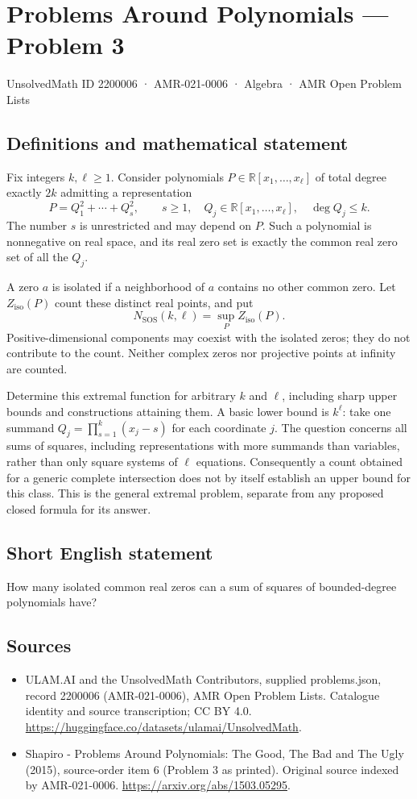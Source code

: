 \documentclass[11pt,a4paper]{article}
\begin{document}
\section*{Problems Around Polynomials — Problem 3}\label{2200006}
{\small UnsolvedMath ID 2200006 · AMR-021-0006 · Algebra · AMR Open Problem Lists}
\subsection{Definitions and mathematical statement}
Fix integers $k,\ell\geq1$. Consider polynomials $P\in
\mathbb R[x_1,\ldots,x_\ell]$ of total degree exactly $2k$ admitting a
representation
\[
 P=Q_1^2+\cdots+Q_s^2,\qquad
 s\geq1,\quad Q_j\in\mathbb R[x_1,\ldots,x_\ell],\quad \deg Q_j\leq k.
\]
The number $s$ is unrestricted and may depend on $P$. Such a polynomial
is nonnegative on real space, and its real zero set is exactly the
common real zero set of all the $Q_j$.

A zero $a$ is isolated if a neighborhood of $a$ contains no other common
zero. Let $Z_{\mathrm{iso}}(P)$ count these distinct real points, and put
\[
 N_{\mathrm{SOS}}(k,\ell)
   =\sup_P Z_{\mathrm{iso}}(P).
\]
Positive-dimensional components may coexist with the isolated zeros;
they do not contribute to the count. Neither complex zeros nor
projective points at infinity are counted.

Determine this extremal function for arbitrary $k$ and $\ell$, including
sharp upper bounds and constructions attaining them. A basic lower
bound is $k^\ell$: take one summand
$Q_j=\prod_{s=1}^{k}(x_j-s)$ for each coordinate $j$.
The question concerns all sums of squares, including representations
with more summands than variables, rather than only square systems
of $\ell$ equations. Consequently a count obtained for a generic
complete intersection does not by itself establish an upper bound
for this class. This is the general extremal problem, separate from
any proposed closed formula for its answer.
\subsection{Short English statement}
How many isolated common real zeros can a sum of squares of bounded-degree polynomials have?
\subsection{Sources}
\begin{itemize}
\item[S1] ULAM.AI and the UnsolvedMath Contributors, supplied problems.json, record 2200006 (AMR-021-0006), AMR Open Problem Lists. Catalogue identity and source transcription; CC BY 4.0.
\url{https://huggingface.co/datasets/ulamai/UnsolvedMath}.
\item[S2] Shapiro - Problems Around Polynomials: The Good, The Bad and The Ugly (2015), source-order item 6 (Problem 3 as printed). Original source indexed by AMR-021-0006.
\url{https://arxiv.org/abs/1503.05295}.
\end{itemize}
\end{document}
